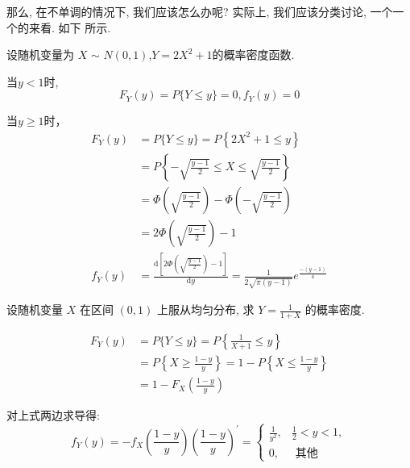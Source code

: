 那么, 在不单调的情况下, 我们应该怎么办呢? 实际上, 我们应该分类讨论, 一个一个的来看. 如下
所示. 

\begin{example}
  设随机变量为 $X$ $\sim$ $N (0, 1)$,$Y = 2X^2+1$的概率密度函数.
\end{example}

\begin{solution}
  当$y < 1$时,
    \[ F_Y(y) = P\{Y \leq y \} = 0,f_Y(y) = 0\]

    \quad 当$y \geq 1$时，
    \begin{align*}
    F_Y(y) & =  P\{Y \leq y\}=P\left\{2 X^2+1 \leq y\right\} \\
    & =P\left\{-\sqrt{\frac{y-1}{2}} \leq X\right.  \left.\leq \sqrt{\frac{y-1}{2}}\right\}\\
    &=\Phi\left(\sqrt{\frac{y-1}{2}}\right)-\Phi\left(-\sqrt{\frac{y-1}{2}}\right) \\
    & =2 \Phi\left(\sqrt{\frac{y-1}{2}}\right)-1\\
    f_Y(y) &= \frac{\mathrm{d}[2\Phi(\sqrt{\frac{y-1}{2}}) - 1]}{\mathrm{d}y} = \frac{1}{2\sqrt{\pi(y-1)}}e^{\frac{-(y-1)}{4}}
    \end{align*}
\end{solution}

\begin{example}
  设随机变量 $X$ 在区间 $(0,1)$ 上服从均匀分布, 求 $Y=\frac{1}{1+X}$ 的概率密度.
\end{example}
\begin{solution}
  $$
\begin{aligned}
F_Y(y) & =P\{Y \leq y\}=P\left\{\frac{1}{X+1} \leq y\right\} \\
& =P\left\{X \geq \frac{1-y}{y}\right\}=1-P\left\{X \leq \frac{1-y}{y}\right\} \\
& =1-F_X\left(\frac{1-y}{y}\right)
\end{aligned}
$$

对上式两边求导得:
$$
f_Y(y)=-f_X\left(\frac{1-y}{y}\right)\left(\frac{1-y}{y}\right)^{\prime}= \begin{cases}\frac{1}{y^2}, & \frac{1}{2}<y<1, \\ 0, & \text { 其他 }\end{cases}
$$
\end{solution}
